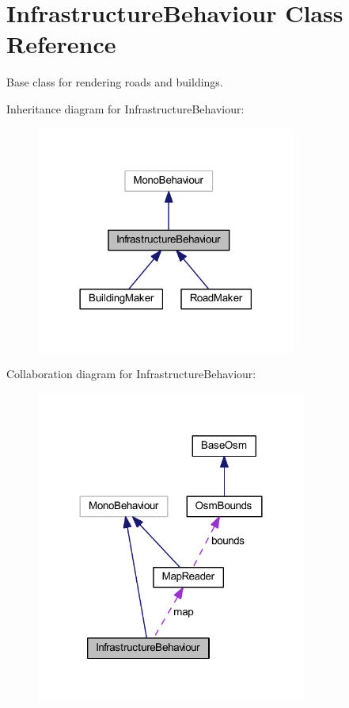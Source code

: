 \hypertarget{class_infrastructure_behaviour}{}\section{Infrastructure\+Behaviour Class Reference}
\label{class_infrastructure_behaviour}


Base class for rendering roads and buildings.  




Inheritance diagram for Infrastructure\+Behaviour\+:\nopagebreak
\begin{figure}[H]
\begin{center}
\leavevmode
\includegraphics[width=242pt]{class_infrastructure_behaviour__inherit__graph}
\end{center}
\end{figure}


Collaboration diagram for Infrastructure\+Behaviour\+:\nopagebreak
\begin{figure}[H]
\begin{center}
\leavevmode
\includegraphics[width=252pt]{class_infrastructure_behaviour__coll__graph}
\end{center}
\end{figure}
